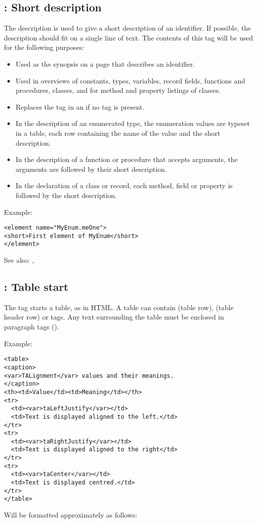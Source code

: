 \subsection{ : Short description}
\label{tag:short}
The  description is used to give a short description of an
identifier. If possible, the description should fit on a single line of
text. The contents of this tag will be used for the following purposes:
\begin{itemize}
\item Used as the synopsis on a page that describes an identifier.
\item Used in overviews of constants, types, variables, record fields, 
functions and procedures, classes, and for method and property listings of classes.
\item Replaces the  tag in an  if no  tag is present.
\item In the description of an enumerated type, the enumeration values are
typeset in a table, each row containing the name of the value and the short
description.
\item In the description of a function or procedure that accepts arguments,
the arguments are followed by their short description.
\item In the declaration of a class or record, each method, field or property
is followed by the short description.
\end{itemize}

Example:
\begin{verbatim}
<element name="MyEnum.meOne">
<short>First element of MyEnum</short>
</element>
\end{verbatim}

See also: , 

\subsection{ : Table start}
\label{tag:table}
The  tag starts a table, as in HTML. A table can contain
 (table row),  (table header row) or  tags.
Any text surrounding the table must be enclosed in paragraph tags ().

Example:
\begin{verbatim}
<table>
<caption>
<var>TALignment</var> values and their meanings.
</caption>
<th><td>Value</td><td>Meaning</td></th>
<tr>
  <td><var>taLeftJustify</var></td>
  <td>Text is displayed aligned to the left.</td>
</tr>
<tr>
  <td><var>taRightJustify</var></td>
  <td>Text is displayed aligned to the right</td>
</tr>
<tr>
  <td><var>taCenter</var></td>
  <td>Text is displayed centred.</td>
</tr>
</table>
\end{verbatim}
Will be formatted approximately as follows:

